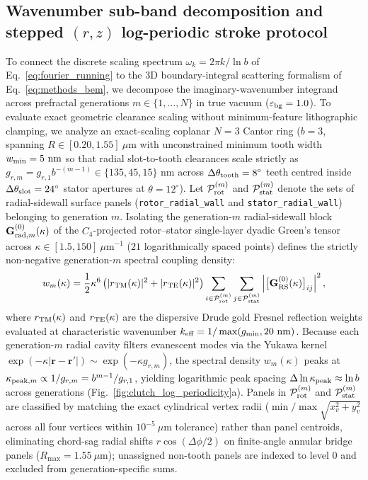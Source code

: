 \documentclass[pdflatex,sn-nature]{sn-jnl}
\begin{document}
\subsection*{Wavenumber sub-band decomposition and stepped $(r,z)$ log-periodic stroke protocol}
To connect the discrete scaling spectrum $\omega_k = 2\pi k / \ln b$ of Eq.~\eqref{eq:fourier_running} to the 3D boundary-integral scattering formalism of Eq.~\eqref{eq:methods_bem}, we decompose the imaginary-wavenumber integrand across prefractal generations $m \in \{1, \dots, N\}$ in true vacuum ($\varepsilon_{\rm bg}=1.0$). To evaluate exact geometric clearance scaling without minimum-feature lithographic clamping, we analyze an exact-scaling coplanar $N=3$ Cantor ring ($b=3$, spanning $R \in [0.20, 1.55]\ \mu\text{m}$ with unconstrained minimum tooth width $w_{\rm min} = 5\text{ nm}$ so that radial slot-to-tooth clearances scale strictly as $g_{r,m} = g_{r,1} b^{-(m-1)} \in \{135, 45, 15\}\text{ nm}$ across $\Delta\theta_{\rm tooth} = 8^\circ$ teeth centred inside $\Delta\theta_{\rm slot} = 24^\circ$ stator apertures at $\theta = 12^\circ$). Let $\mathcal{P}_{\rm rot}^{(m)}$ and $\mathcal{P}_{\rm stat}^{(m)}$ denote the sets of radial-sidewall surface panels (\texttt{rotor\_radial\_wall} and \texttt{stator\_radial\_wall}) belonging to generation $m$. Isolating the generation-$m$ radial-sidewall block $\mathbf{G}_{{\rm rad},m}^{(0)}(\kappa)$ of the $C_4$-projected rotor--stator single-layer dyadic Green's tensor across $\kappa \in [1.5, 150]\ \mu\text{m}^{-1}$ ($21$ logarithmically spaced points) defines the strictly non-negative generation-$m$ spectral coupling density:
\begin{equation}
w_m(\kappa) = \frac{1}{2}\kappa^6 \left( |r_{\rm TM}(\kappa)|^2 + |r_{\rm TE}(\kappa)|^2 \right) \sum_{i \in \mathcal{P}_{\rm rot}^{(m)}} \sum_{j \in \mathcal{P}_{\rm stat}^{(m)}} \left| \bigl[\mathbf{G}_{\rm RS}^{(0)}(\kappa)\bigr]_{ij} \right|^2,
\label{eq:methods_spectral_subband}
\end{equation}
where $r_{\rm TM}(\kappa)$ and $r_{\rm TE}(\kappa)$ are the dispersive Drude gold Fresnel reflection weights evaluated at characteristic wavenumber $k_{\rm eff} = 1/\max(g_{\rm min}, 20\text{ nm})$. Because each generation-$m$ radial cavity filters evanescent modes via the Yukawa kernel $\exp(-\kappa |\mathbf{r}-\mathbf{r}'|) \sim \exp(-\kappa g_{r,m})$, the spectral density $w_m(\kappa)$ peaks at $\kappa_{{\rm peak},m} \propto 1/g_{r,m} = b^{m-1}/g_{r,1}$, yielding logarithmic peak spacing $\Delta\ln\kappa_{\rm peak} \approx \ln b$ across generations (Fig.~\ref{fig:clutch_log_periodicity}a). Panels in $\mathcal{P}_{\rm rot}^{(m)}$ and $\mathcal{P}_{\rm stat}^{(m)}$ are classified by matching the exact cylindrical vertex radii ($\min/\max \sqrt{x_v^2 + y_v^2}$ across all four vertices within $10^{-5}\ \mu\text{m}$ tolerance) rather than panel centroids, eliminating chord-sag radial shifts $r\cos(\Delta\phi/2)$ on finite-angle annular bridge panels ($R_{\max} = 1.55\ \mu\text{m}$); unassigned non-tooth panels are indexed to level $0$ and excluded from generation-specific sums.
\end{document}

